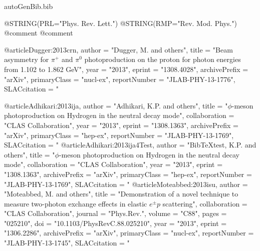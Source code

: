 \begin{filecontents*}{autoGenBib.bib}

@STRING(PRL="Phys. Rev. Lett.")
@STRING(RMP="Rev. Mod. Phys.")
@comment %
@comment %

@article{Dugger:2013crn,
      author         = "Dugger, M. and others",
      title          = "{Beam asymmetry for $\pi^+$ and $\pi^0$ photoproduction on the
                        proton for photon energies from 1.102 to 1.862 GeV}",
      year           = "2013",
      eprint         = "1308.4028",
      archivePrefix  = "arXiv",
      primaryClass   = "nucl-ex",
      reportNumber   = "JLAB-PHY-13-1776",
      SLACcitation   = "%
}

@article{Adhikari:2013ija,
      author         = "Adhikari, K.P. and others",
      title          = "{$\phi$-meson photoproduction on Hydrogen in the neutral
                        decay mode}",
      collaboration  = "CLAS Collaboration",
      year           = "2013",
      eprint         = "1308.1363",
      archivePrefix  = "arXiv",
      primaryClass   = "hep-ex",
      reportNumber   = "JLAB-PHY-13-1769",
      SLACcitation   = "%
}
@article{Adhikari:2013ija4Test,
      author         = "BibTeXtest, K.P. and others",
      title          = "{$\phi$-meson photoproduction on Hydrogen in the neutral
                        decay mode}",
      collaboration  = "CLAS Collaboration",
      year           = "2013",
      eprint         = "1308.1363",
      archivePrefix  = "arXiv",
      primaryClass   = "hep-ex",
      reportNumber   = "JLAB-PHY-13-1769",
      SLACcitation   = "%
}
@article{Moteabbed:2013isu,
      author         = "Moteabbed, M. and others",
      title          = "{Demonstration of a novel technique to measure two-photon
                        exchange effects in elastic $e^\pm p$ scattering}",
      collaboration  = "CLAS Collaboration",
      journal        = "Phys.Rev.",
      volume         = "C88",
      pages          = "025210",
      doi            = "10.1103/PhysRevC.88.025210",
      year           = "2013",
      eprint         = "1306.2286",
      archivePrefix  = "arXiv",
      primaryClass   = "nucl-ex",
      reportNumber   = "JLAB-PHY-13-1745",
      SLACcitation   = "%
}


\end{filecontents*}
